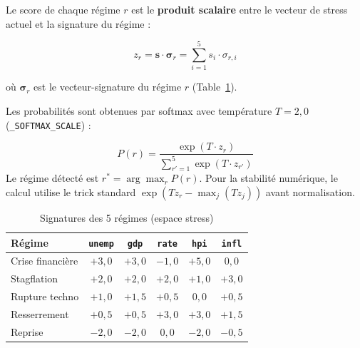 \documentclass[12pt,a4paper]{article}
\begin{document}
Le score de chaque r\'egime $r$ est le \textbf{produit scalaire} entre le vecteur
de stress actuel et la signature du r\'egime :

\begin{equation}
    z_r = \mathbf{s} \cdot \boldsymbol{\sigma}_r = \sum_{i=1}^{5} s_i \cdot \sigma_{r,i}
    \label{eq:dot_product}
\end{equation}

o\`u $\boldsymbol{\sigma}_r$ est le vecteur-signature du r\'egime $r$
(Table~\ref{tab:signatures}).

Les probabilit\'es sont obtenues par softmax avec temp\'erature $T = 2{,}0$
(\texttt{\_SOFTMAX\_SCALE}) :

\begin{formulebox}
\begin{equation}
    P(r) = \frac{\exp(T \cdot z_r)}{\displaystyle\sum_{r'=1}^{5} \exp(T \cdot z_{r'})}
    \label{eq:softmax}
\end{equation}
Le r\'egime d\'etect\'e est $r^* = \arg\max_r P(r)$.
Pour la stabilit\'e num\'erique, le calcul utilise le trick standard
$\exp(T z_r - \max_j(T z_j))$ avant normalisation.
\end{formulebox}

\begin{table}[htbp]
\centering
\caption{Signatures des 5 r\'egimes (espace stress)}
\label{tab:signatures}
\begin{tabular}{lccccc}
\toprule
\textbf{R\'egime} & \texttt{unemp} & \texttt{gdp} & \texttt{rate} & \texttt{hpi} & \texttt{infl} \\
\midrule
Crise financi\`ere & $+3{,}0$ & $+3{,}0$ & $-1{,}0$ & $+5{,}0$ & $0{,}0$ \\
Stagflation & $+2{,}0$ & $+2{,}0$ & $+2{,}0$ & $+1{,}0$ & $+3{,}0$ \\
Rupture techno & $+1{,}0$ & $+1{,}5$ & $+0{,}5$ & $0{,}0$ & $+0{,}5$ \\
Resserrement & $+0{,}5$ & $+0{,}5$ & $+3{,}0$ & $+3{,}0$ & $+1{,}5$ \\
Reprise & $-2{,}0$ & $-2{,}0$ & $0{,}0$ & $-2{,}0$ & $-0{,}5$ \\
\bottomrule
\end{tabular}
\end{table}
\end{document}
